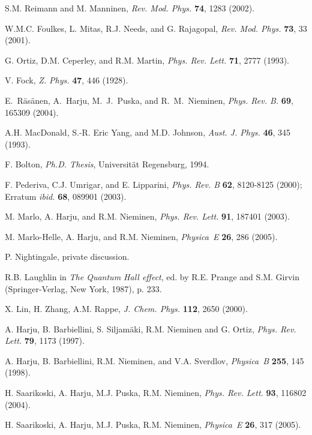\documentclass{article}
\begin{document}
\begin{thebibliography}{9}

 S.M. Reimann and
M. Manninen, {\it Rev. Mod. Phys.} {\bf 74}, 1283 (2002).

 W.M.C. Foulkes, L. Mitas, R.J. Needs, and
  G. Rajagopal, {\it Rev. Mod. Phys.} {\bf 73}, {33} (2001).
  
 G. Ortiz, D.M. Ceperley, and R.M. Martin, {\it Phys.
  Rev. Lett.} {\bf 71}, 2777 (1993).

 V. Fock, {\it Z. Phys.} {\bf 47}, 446 (1928).

 E.~R\"as\"anen, A.~Harju, M.~J.~Puska, and R.~M.~Nieminen,
{\it Phys. Rev. B.} {\bf 69}, 165309 (2004).

 A.H. MacDonald, S.-R. Eric Yang, and
  M.D. Johnson, {\it Aust.  J. Phys.} {\bf 46}, 345 (1993).

F. Bolton, {\it Ph.D. Thesis}, Universit{\"a}t Regensburg, 1994.

 F. Pederiva, C.J. Umrigar, and E. Lipparini,
{\it Phys. Rev. B} {\bf 62}, 8120-8125 (2000); Erratum {\it ibid.} {\bf 68},
089901 (2003).

 M. Marlo, A. Harju, and
R.M. Nieminen, {\it Phys. Rev. Lett.} {\bf 91}, 187401 (2003).

M. Marlo-Helle, A. Harju, and
R.M. Nieminen, {\it Physica~E}
{\bf 26}, 286 (2005).

 P. Nightingale, private discussion.

 R.B. Laughlin in {\em The Quantum Hall effect},
ed. by R.E. Prange and S.M. Girvin (Springer-Verlag, New York, 1987),
p. 233.

 X. Lin, H. Zhang, A.M. Rappe, {\it J. Chem. Phys.} {\bf
112}, 2650 (2000).

 A. Harju, B. Barbiellini, S. Siljam\"aki, R.M. Nieminen
and G. Ortiz, {\it Phys. Rev. Lett.} {\bf 79}, 1173 (1997).

 A. Harju, B. Barbiellini, R.M. Nieminen, and
V.A. Sverdlov, {\it Physica~B} {\bf 255}, 145 (1998).

 H. Saarikoski, A. Harju, M.J. Puska, R.M. Nieminen,
{\it Phys. Rev. Lett.} {\bf 93}, 116802 (2004).

  H. Saarikoski, A. Harju, M.J. Puska, R.M. Nieminen,
{\it   Physica~E} {\bf 26}, 317 (2005).


\end{thebibliography}
\end{document}
